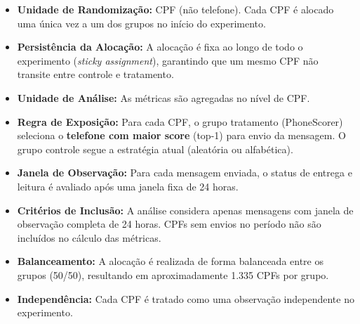 \begin{itemize}
    \item \textbf{Unidade de Randomização:} CPF (não telefone). Cada CPF é alocado uma única vez a um dos grupos no início do experimento.

    \item \textbf{Persistência da Alocação:} A alocação é fixa ao longo de todo o experimento (\textit{sticky assignment}), garantindo que um mesmo CPF não transite entre controle e tratamento.

    \item \textbf{Unidade de Análise:} As métricas são agregadas no nível de CPF.

    \item \textbf{Regra de Exposição:} Para cada CPF, o grupo tratamento (PhoneScorer) seleciona o \textbf{telefone com maior score} (top-1) para envio da mensagem. O grupo controle segue a estratégia atual (aleatória ou alfabética).

    \item \textbf{Janela de Observação:} Para cada mensagem enviada, o status de entrega e leitura é avaliado após uma janela fixa de 24 horas.

    \item \textbf{Critérios de Inclusão:} A análise considera apenas mensagens com janela de observação completa de 24 horas. CPFs sem envios no período não são incluídos no cálculo das métricas.

    \item \textbf{Balanceamento:} A alocação é realizada de forma balanceada entre os grupos (50/50), resultando em aproximadamente 1.335 CPFs por grupo.

    \item \textbf{Independência:} Cada CPF é tratado como uma observação independente no experimento.
\end{itemize}